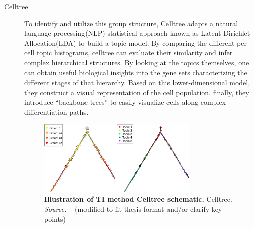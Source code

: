 \begin{description}
    \item[Celltree]
    To identify and utilize this group structure, Celltree\citep{duverle2016celltree} adapts a natural language processing(NLP) statistical approach known as Latent Dirichlet Allocation(LDA) to build a topic model. By comparing the different per-cell topic histograms, celltree can evaluate their similarity and infer complex hierarchical structures. By looking at the topics themselves, one can obtain useful biological insights into the gene sets characterizing the different stages of that hierarchy. Based on this lower-dimensional model, they construct a visual representation of the cell population. finally, they introduce “backbone trees” to easily visualize cells along complex differentiation paths.
    \begin{figure}[ht!]
    	\centering
    	\includegraphics[width=0.75\textwidth]{TI_Alg_celltree/fig}
    	\vspace{0.1cm}
    	\caption[Illustration of TI method Celltree schematic.]{\textbf{Illustration of TI method Celltree schematic.} Celltree. \emph{Source: ~\cite{duverle2016celltree}} (modified to fit thesis format and/or clarify key points)
    	}
    	\label{fig:TI_Alg_celltree}
    \end{figure}
    

\end{description}
